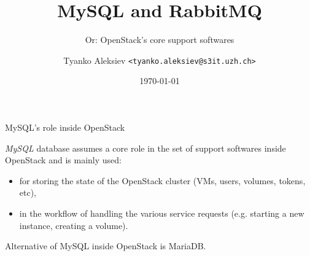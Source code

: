 \documentclass[english,serif,mathserif]{beamer}
\begin{document}
\title[Short Title]{MySQL and RabbitMQ} 
\subtitle{Or: OpenStack's core support softwares} 

\author{Tyanko Aleksiev \texttt{<tyanko.aleksiev@s3it.uzh.ch>}}

\date{\today}

\maketitle

\begin{frame}{MySQL's role inside OpenStack}

\textit{MySQL} database assumes a core role in the set of support softwares
inside OpenStack and is mainly used:

\begin{itemize}
\item for storing the state of the OpenStack cluster (VMs, users, volumes, tokens, etc), 
\item in the workflow of handling the various service requests (e.g. starting a new instance, creating a volume).
\end{itemize}

Alternative of MySQL inside OpenStack is MariaDB.

\end{frame}
\end{document}
